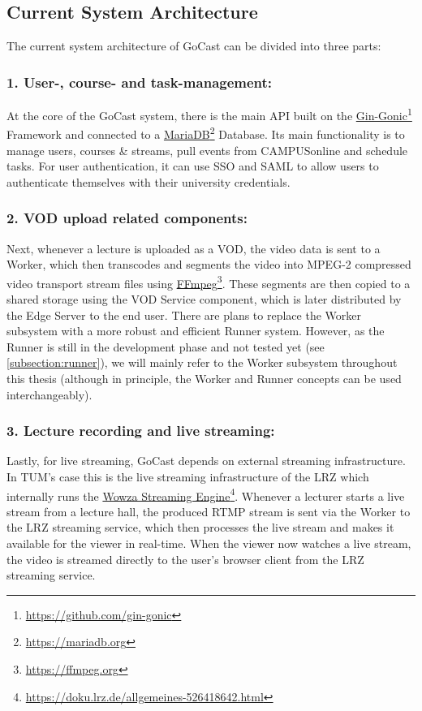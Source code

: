 \subsection{Current System Architecture}

The current system architecture of GoCast can be divided into three parts:

\subsubsection{1. User-, course- and task-management:}
At the core of the GoCast system, there is the main \ac{API} built on the \href{https://github.com/gin-gonic/gin}{Gin-Gonic}\footnote{\url{https://github.com/gin-gonic}} Framework and connected to a \href{https://mariadb.org}{MariaDB}\footnote{\url{https://mariadb.org}} Database. Its main functionality is to manage users, courses \& streams, pull events from CAMPUSonline and schedule tasks. For user authentication, it can use \ac{SSO} and \ac{SAML} to allow users to authenticate themselves with their university credentials.

\subsubsection{2. \ac{VOD} upload related components:}
Next, whenever a lecture is uploaded as a VOD, the video data is sent to a Worker, which then transcodes and segments the video into MPEG-2 compressed video transport stream files using \href{https://ffmpeg.org/}{FFmpeg}\footnote{\url{https://ffmpeg.org}}. These segments are then copied to a shared storage using the VOD Service component, which is later distributed by the Edge Server to the end user.
There are plans to replace the Worker subsystem with a more robust and efficient Runner system. However, as the Runner is still in the development phase and not tested yet (see \autoref{subsection:runner}), we will mainly refer to the Worker subsystem throughout this thesis (although in principle, the Worker and Runner concepts can be used interchangeably).

\subsubsection{3. Lecture recording and live streaming:}
Lastly, for live streaming, GoCast depends on external streaming infrastructure. In \ac{TUM}'s case this is the live streaming infrastructure of the \ac{LRZ} which internally runs the \href{https://doku.lrz.de/allgemeines-526418642.html}{Wowza Streaming Engine}\footnote{\url{https://doku.lrz.de/allgemeines-526418642.html}}. Whenever a lecturer starts a live stream from a lecture hall, the produced \ac{RTMP} stream is sent via the Worker to the \ac{LRZ} streaming service, which then processes the live stream and makes it available for the viewer in real-time. When the viewer now watches a live stream, the video is streamed directly to the user's browser client from the \ac{LRZ} streaming service. 

